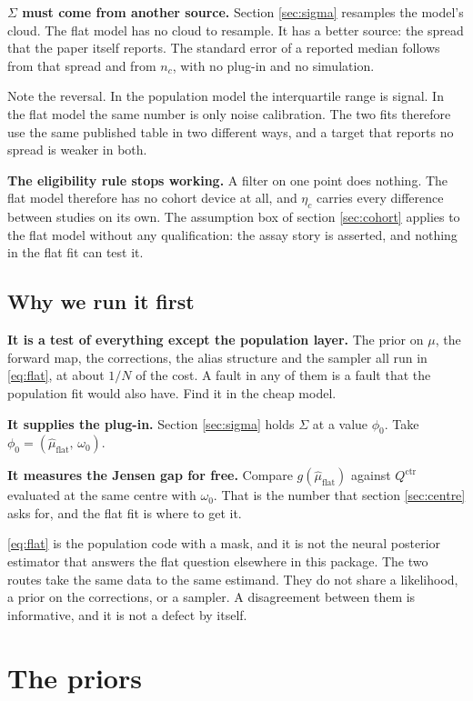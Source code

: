 \documentclass[11pt]{article}
\newcommand{\ctr}{\mathrm{ctr}}
\begin{document}
\textbf{$\Sigma$ must come from another source.} Section \ref{sec:sigma}
resamples the model's cloud. The flat model has no cloud to resample. It has a
better source: the spread that the paper itself reports. The standard error of a
reported median follows from that spread and from $n_c$, with no plug-in and no
simulation.

Note the reversal. In the population model the interquartile range is signal. In
the flat model the same number is only noise calibration. The two fits therefore
use the same published table in two different ways, and a target that reports no
spread is weaker in both.

\textbf{The eligibility rule stops working.} A filter on one point does nothing.
The flat model therefore has no cohort device at all, and $\eta_c$ carries every
difference between studies on its own. The assumption box of section
\ref{sec:cohort} applies to the flat model without any qualification: the assay
story is asserted, and nothing in the flat fit can test it.

\subsection{Why we run it first}

\textbf{It is a test of everything except the population layer.} The prior on
$\mu$, the forward map, the corrections, the alias structure and the sampler all
run in \eqref{eq:flat}, at about $1/N$ of the cost. A fault in any of them is a
fault that the population fit would also have. Find it in the cheap model.

\textbf{It supplies the plug-in.} Section \ref{sec:sigma} holds $\Sigma$ at a
value $\phi_0$. Take $\phi_0=(\hat\mu_{\text{flat}},\,\omega_0)$.

\textbf{It measures the Jensen gap for free.} Compare $g(\hat\mu_{\text{flat}})$
against $Q^\ctr$ evaluated at the same centre with $\omega_0$. That is the number
that section \ref{sec:centre} asks for, and the flat fit is where to get it.

\eqref{eq:flat} is the population code with a mask, and it is not the neural
posterior estimator that answers the flat question elsewhere in this package.
The two routes take the same data to the same estimand. They do not share a
likelihood, a prior on the corrections, or a sampler. A disagreement between them
is informative, and it is not a defect by itself.

\section{The priors}
\end{document}
